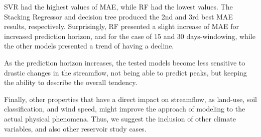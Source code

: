 \documentclass[12pt]{article}
\begin{document}
SVR had the highest values of MAE, while RF had the lowest values. The Stacking Regressor and decision tree produced the 2nd and 3rd best MAE results, respectively. Surprisingly, RF presented a slight increase of MAE for increased prediction horizon, and for the case of 15 and 30 days-windowing, while the other models presented a trend of having a decline.

As the prediction horizon increases, the tested models become less sensitive to drastic changes in the streamflow, not being able to predict peaks, but keeping the ability to describe the overall tendency.

Finally, other properties that have a direct impact on streamflow, as land-use, soil classification, and wind speed, might improve the approach of modeling to the actual physical phenomena. Thus, we suggest the inclusion of other climate variables, and also other reservoir study cases.




\appendix

\end{document}
